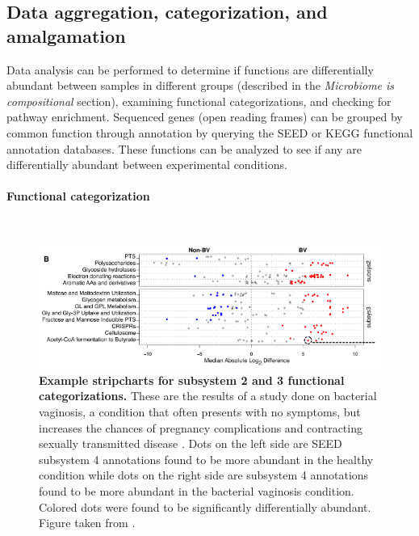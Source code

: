 \subsection{Data aggregation, categorization, and amalgamation}
Data analysis can be performed to determine if functions are differentially abundant between samples in different groups (described in the \textit{Microbiome is compositional} section), examining functional categorizations, and checking for pathway enrichment. Sequenced genes (open reading frames) can be grouped by common function through annotation by querying the SEED or KEGG functional annotation databases. These functions can be analyzed to see if any are differentially abundant between experimental conditions.

\paragraph{Functional categorization}\mbox{}\\

\begin{figure}[h]
\begin{center}
\includegraphics[width=\textwidth]{stripchart.png}
\caption[Example stripcharts for subsystem 2 and 3 functional categorizations.]{\textbf{Example stripcharts for subsystem 2 and 3 functional categorizations.} These are the results of a study done on bacterial vaginosis, a condition that often presents with no symptoms, but increases the chances of pregnancy complications \cite{hillier1995association} \cite{hay1994abnormal} and contracting sexually transmitted disease \cite{martin1999vaginal} \cite{cherpes2003association}. Dots on the left side are SEED subsystem 4 annotations found to be more abundant in the healthy condition while dots on the right side are subsystem 4 annotations found to be more abundant in the bacterial vaginosis condition. Colored dots were found to be significantly differentially abundant. Figure taken from \cite{macklaim2013comparative}.}
\label{stripchart_example}
\end{center}
\end{figure}

